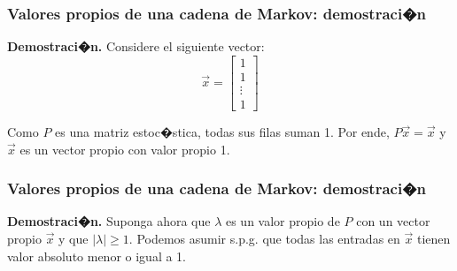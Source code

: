 \documentclass{beamer}
\newcommand{\vs}[1]{\vspace{#1mm}}
\begin{document}
\begin{frame}
	\frametitle{Valores propios de una cadena de Markov: demostraci�n}
	
	{\small
		
		{\bf Demostraci�n.} Considere el siguiente vector:
		$$
		\vec x = \begin{bmatrix}
		1\\
		1\\
		\vdots\\
		1
		\end{bmatrix}
		$$
		
		\vs{4}
		
		Como $P$ es una matriz estoc�stica, todas sus filas suman 1. Por ende, $P \vec x = \vec x$ y $\vec x$ es un vector propio con valor propio 1.

	}
	
\end{frame}

\begin{frame}
	\frametitle{Valores propios de una cadena de Markov: demostraci�n}
	
	{\small
		
		{\bf Demostraci�n.} Suponga ahora que $\lambda$ es un valor propio de $P$ con un vector propio $\vec x$ y que $\vert\lambda\vert\geq 1$. Podemos asumir s.p.g. que todas las entradas en $\vec x$ tienen valor absoluto menor o igual a 1.
		
		\vs{4}
		
		\vs{4}
	
		\vs{4}
	}
	
\end{frame}
	
\end{document}
